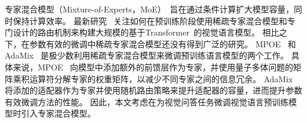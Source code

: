 专家混合模型（Mixture-of-Experts，MoE）~\cite{shazeer2017outrageously}旨在通过条件计算扩大模型容量，同时保持计算效率。
最新研究~\cite{lepikhin2021gshard,fedus2021switch,lin2021m6,roller2021hash,lewis2021base,riquelme2021scaling,du2022glam} 关注如何在预训练阶段使用稀疏专家混合模型和专门设计的路由机制来构建大规模的基于Transformer~\cite{vaswani2017attention}的视觉语言模型。
相比之下，在参数有效的微调中稀疏专家混合模型还没有得到广泛的研究。
MPOE~\cite{gao2022parameter} 和 AdaMix~\cite{wang2022adamix} 是极少数利用稀疏专家混合模型来微调预训练语言模型的两个工作。
具体来说，MPOE~\cite{gao2022parameter} 向模型中添加额外的前馈层作为专家，并使用量子多体问题的矩阵乘积运算符分解专家的权重矩阵，以减少不同专家之间的信息冗余。
AdaMix~\cite{wang2022adamix} 将添加的适配器作为专家并使用随机路由策略来提升适配器的容量，进而提升参数有效微调方法的性能。
因此，本文考虑在为视觉问答任务微调视觉语言预训练模型时引入专家混合模型。

